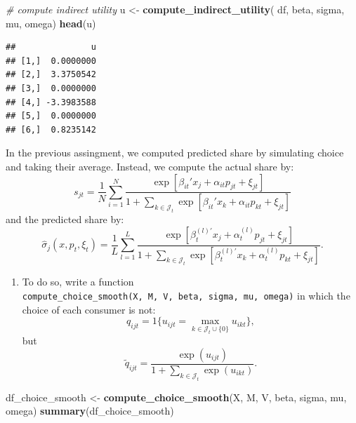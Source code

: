 \documentclass[]{book}
\newenvironment{Shaded}{\begin{snugshade}}{\end{snugshade}}
\newcommand{\KeywordTok}[1]{\textcolor[rgb]{0.13,0.29,0.53}{\textbf{#1}}}
\newcommand{\StringTok}[1]{\textcolor[rgb]{0.31,0.60,0.02}{#1}}
\newcommand{\CommentTok}[1]{\textcolor[rgb]{0.56,0.35,0.01}{\textit{#1}}}
\newcommand{\NormalTok}[1]{#1}
\providecommand{\tightlist}{%
  \setlength{\itemsep}{0pt}\setlength{\parskip}{0pt}}
\begin{document}
\begin{Shaded}
\begin{Highlighting}[]
\CommentTok{# compute indirect utility}
\NormalTok{u <-}\StringTok{ }
\StringTok{  }\KeywordTok{compute_indirect_utility}\NormalTok{(}
\NormalTok{    df, beta, sigma, }
\NormalTok{           mu, omega)}
\KeywordTok{head}\NormalTok{(u)}
\end{Highlighting}
\end{Shaded}

\begin{verbatim}
##               u
## [1,]  0.0000000
## [2,]  3.3750542
## [3,]  0.0000000
## [4,] -3.3983588
## [5,]  0.0000000
## [6,]  0.8235142
\end{verbatim}

In the previous assingment, we computed predicted share by simulating
choice and taking their average. Instead, we compute the actual share
by: \[
s_{jt} = \frac{1}{N} \sum_{i = 1}^N \frac{\exp[\beta_{it}' x_j + \alpha_{it} p_{jt} + \xi_{jt}]}{1 + \sum_{k \in \mathcal{J}_t} \exp[\beta_{it}' x_k + \alpha_{it} p_{kt} + \xi_{jt}]}
\] and the predicted share by: \[
\widehat{\sigma}_{j}(x, p_t, \xi_t) = \frac{1}{L} \sum_{l = 1}^L \frac{\exp[\beta_{t}^{(l)\prime} x_j + \alpha_{t}^{(l)} p_{jt} + \xi_{jt}]}{1 + \sum_{k \in \mathcal{J}_t} \exp[\beta_{t}^{(l)\prime} x_k + \alpha_{t}^{(l)} p_{kt} + \xi_{jt}]}.
\]

\begin{enumerate}
\def\labelenumi{\arabic{enumi}.}
\setcounter{enumi}{7}
\tightlist
\item
  To do so, write a function
  \texttt{compute\_choice\_smooth(X,\ M,\ V,\ beta,\ sigma,\ mu,\ omega)}
  in which the choice of each consumer is not: \[
  q_{ijt} = 1\{u_{ijt} = \max_{k \in \mathcal{J}_t \cup \{0\}} u_{ikt}\},
  \] but \[
  \tilde{q}_{ijt} = \frac{\exp(u_{ijt})}{1 + \sum_{k \in \mathcal{J}_t} \exp(u_{ikt})}.
  \]
\end{enumerate}

\begin{Shaded}
\begin{Highlighting}[]
\NormalTok{df_choice_smooth <-}
\StringTok{  }\KeywordTok{compute_choice_smooth}\NormalTok{(X, M, V, beta, sigma, mu, omega)}
\KeywordTok{summary}\NormalTok{(df_choice_smooth)}
\end{Highlighting}
\end{Shaded}
\end{document}
